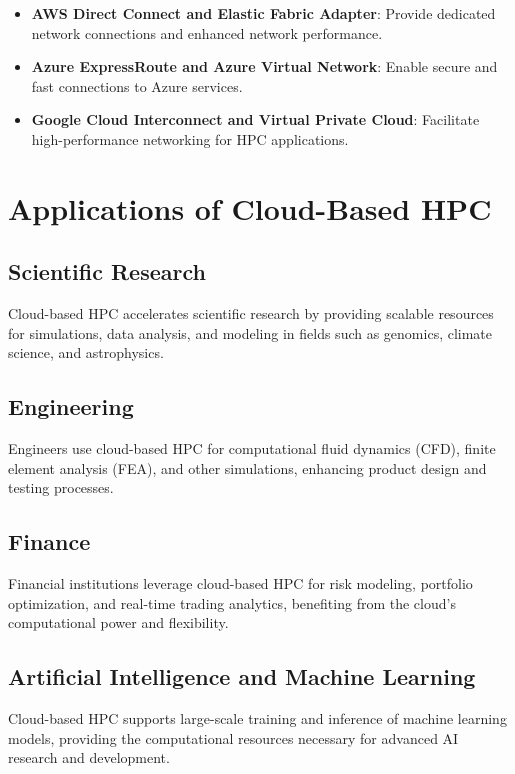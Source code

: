 \begin{itemize}
    \item \textbf{AWS Direct Connect and Elastic Fabric Adapter}: Provide dedicated network connections and enhanced network performance.
    \item \textbf{Azure ExpressRoute and Azure Virtual Network}: Enable secure and fast connections to Azure services.
    \item \textbf{Google Cloud Interconnect and Virtual Private Cloud}: Facilitate high-performance networking for HPC applications.
\end{itemize}

\section{Applications of Cloud-Based HPC}

\subsection{Scientific Research}

Cloud-based HPC accelerates scientific research by providing scalable resources for simulations, data analysis, and modeling in fields such as genomics, climate science, and astrophysics.

\subsection{Engineering}

Engineers use cloud-based HPC for computational fluid dynamics (CFD), finite element analysis (FEA), and other simulations, enhancing product design and testing processes.

\subsection{Finance}

Financial institutions leverage cloud-based HPC for risk modeling, portfolio optimization, and real-time trading analytics, benefiting from the cloud's computational power and flexibility.

\subsection{Artificial Intelligence and Machine Learning}

Cloud-based HPC supports large-scale training and inference of machine learning models, providing the computational resources necessary for advanced AI research and development.

